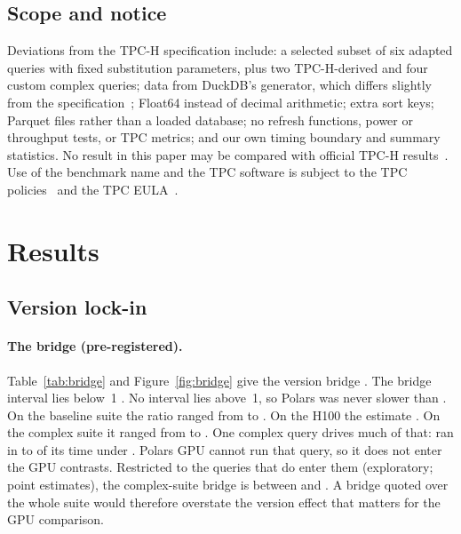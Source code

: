 \documentclass[11pt]{article}
\begin{document}
\subsection{Scope and notice}
\label{sec:scope}
\tpcdisclaimer{} Deviations from the TPC-H specification include: a selected
subset of six adapted queries with fixed substitution parameters, plus two
TPC-H-derived and four custom complex queries; data from DuckDB's generator,
which differs slightly from the specification~\citep{duckdb_tpch_ext};
Float64 instead of decimal arithmetic; extra sort keys; Parquet files rather
than a loaded database; no refresh functions, power or throughput tests, or
TPC metrics; and our own timing boundary and summary statistics. No result in
this paper may be compared with official TPC-H
results~\citep{tpch301,boncz2014tpch}. Use of the benchmark name and the TPC
software is subject to the TPC
policies~\citep{tpcpolicies620,tpcfairuse2019} and the TPC
EULA~\citep{tpceula22}.

\section{Results}
\label{sec:results}

\subsection{Version lock-in}
\label{sec:res-version}

\paragraph{The bridge (pre-registered).}
Table~\ref{tab:bridge} and Figure~\ref{fig:bridge} give the version bridge . The bridge interval lies below~1 . No
interval lies above~1, so Polars \polarsnew{} was never slower than
\polarsold{}. On the
baseline suite the ratio ranged from  to
. On the H100 the estimate . On the complex suite it ranged from
 to . One complex query
drives much of that:  ran in  to
 of its \polarsold{} time under \polarsnew{}.
Polars GPU cannot run that query, so it does not enter the GPU contrasts.
Restricted to the queries that do enter them (exploratory; point estimates),
the complex-suite bridge is between  and
. A bridge quoted over the whole suite would
therefore overstate the version effect that matters for the GPU comparison.
\end{document}
